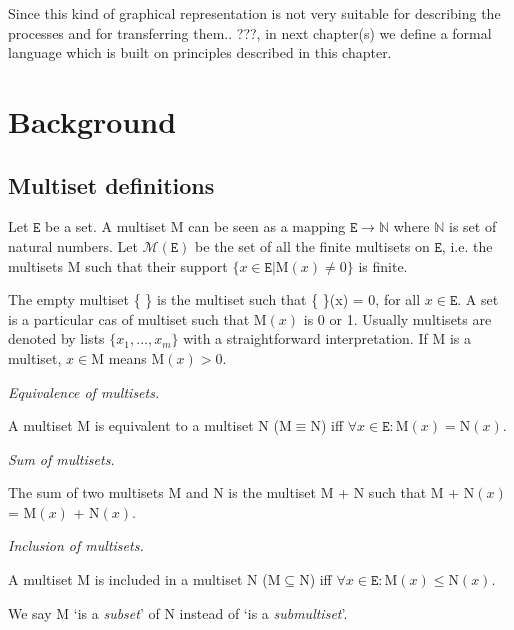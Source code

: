 \documentclass{elsarticle}
\begin{document}
Since this kind of graphical representation is not very suitable for describing the processes and for transferring them.. ???, in next chapter(s) we define a formal language which is built on principles described in this chapter.


\section{Background}
\subsection{Multiset definitions}

Let $\mathtt{E}$ be a set. A multiset $\mathrm{M}$ can be seen as a mapping $\mathtt{E} \rightarrow \mathbb{N}$ where $\mathbb{N}$ is set of natural numbers. Let $\mathscr{M}(\mathtt{E})$ be the set of all the finite multisets on $\mathtt{E}$, i.e. the multisets $\mathrm{M}$ such that their support $\{ x \in \mathtt{E} | \mathrm{M}(x) \neq 0 \}$ is finite.

The empty multiset \{ \} is the multiset such that \{ \}(x) = 0, for all $x \in \mathtt{E}$. A set is a particular cas of multiset such that $\mathrm{M}(x)$ is 0 or 1. Usually multisets are denoted by lists $\{ x_1, \ldots, x_m \}$ with a straightforward interpretation. If $\mathrm{M}$ is a multiset, $x \in \mathrm{M}$ means $\mathrm{M}(x) > 0$.

\begin{definition}
\emph{Equivalence of multisets.}

\noindent A multiset $\mathrm{M}$ is equivalent to a multiset $\mathrm{N}$ ($\mathrm{M} \equiv \mathrm{N}$) iff $\forall x \in \mathtt{E}: \mathrm{M}(x) = \mathrm{N}(x)$.
\end{definition}

\begin{definition}
\emph{Sum of multisets.}

\noindent The sum of two multisets $\mathrm{M}$ and $\mathrm{N}$ is the multiset $\mathrm{M}$ + $\mathrm{N}$ such that $\mathrm{M}$ + $\mathrm{N}(x)$ = $\mathrm{M}(x)$ + $\mathrm{N}(x)$.
\end{definition}

\begin{definition}
\emph{Inclusion of multisets.}

\noindent A multiset $\mathrm{M}$ is included in a multiset $\mathrm{N}$ ($\mathrm{M} \subseteq \mathrm{N}$) iff $\forall x \in \mathtt{E}: \mathrm{M}(x) \leq \mathrm{N}(x)$.

We say $\mathrm{M}$ `is a \emph{subset}' of $\mathrm{N}$ instead of `is a \emph{submultiset}'.
\end{definition}
\end{document}
